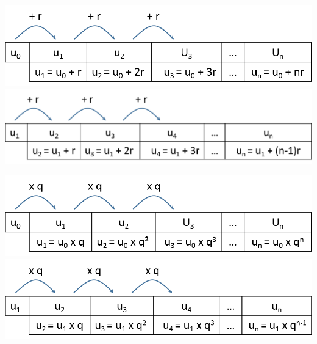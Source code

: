 \documentclass[12pt,a4paper]{article}
\date{}
\title{}
\begin{document}

\begin{multicols}{2}
	\includegraphics[scale=0.45]{./img/arith1}
	\includegraphics[scale=0.45]{./img/arith2}
\end{multicols}

\begin{multicols}{2}
	\includegraphics[scale=0.45]{./img/geo1}
	\includegraphics[scale=0.45]{./img/geo2}
\end{multicols}





	
\end{document}
